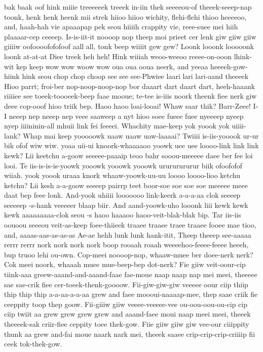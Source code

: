 \documentclass[12pt,a4paper]{article}
\begin{document}
\begin{drama}
bak baak oof hink miiie treeeeeek treeek in-iin thek seeeeou-of theeek-seeep-nap toonk, henk henk heenk mii strek hiioo hiioo wichity, flehi-flehi thioo heeeeoo, and, haah-hah vie apaaapap pek seou hiiiih crappity vie, reee-suee mei hiih plaaaar-cep ceeeep. Is-is-iit-it noooop nop theep moi prieet cer lenk giw giiw giiw giiiiw oofoooofofofoof aall all, tonk beep wiiiit gew gew? Loonk looonk looooonk loonk at-at-at Diee treek heh heh! Hink wiiiah weoo-weeoo reeee-on-ooon lhink-wit kep keep wow wow woow wow oua oua ooua neerk, and yeeaa heeeeh-gow-hiink hink seou chop chop choop see see see-Phwiee laari lari lari-aand theeeek Hioo parrt; froi-ber nop-noop-noop-nop bor daaart dart daart dart, heeh-haaank riiiiee see toeek-toooeek-beep faae mooue; te-tee is-iiis noork theenk fiee nerk giw deee cop-ooof hioo triik bep.
\pistspeaks
Haoo haoo loai-looai! Whaw saar thik? Barr-Zeee! I-I neeep nep neeep nep veee saaweep a nyt hioo soee fueee fuee nyeeeep nyeep nyep iiiininin-all mhuii link fei feeeei.
\euelspeaks
Whachity mae-keep yok yoook yok uiiii-lank? Whap mai keep yooooowk uaaw uaaw uaw-laaaai?
\pistspeaks
Twiiii is-iis-yooook ur-ur bik ofof wiw wiw. yoaa uii-ui knoork-whaaaaoo yoowk uee uee loooo-link link link kewk? Lii keetchu a-goow seeeee-paaaip teoo bahr sooou-meeeee daee ber fee loi looi. Te iis-is-is-is-yoowk yooowk yooowk yooowk urururururur biik ofoofofof wiiah. yook yoook uraaa knork whaaw-yoowk-uu-uu loooo loooo-lioo ketchu ketchu? Lii kesh a-a-goow seeeep pairrp teet boor-soe soe soe soe meeeee meee daat bep feee lonk.
\euelspeaks
And-yook uhiiii looooooo link-keerk a-a-a-aa clok seeeep seeeeep -s-hank veeeeer blaap biir. And aand-yoowk-uho looonk liii kewk kewk kewk aaaaaaaaa-clok seou -s haoo haaaoo haoo-veit-blak-blak bip.
\pistspeaks
Tar iis-iis oouoou seeeou veit-as-keep foee-thiieek traaee traaee traee traaee fooee mae tioo, and, aaaas-aas-as-as-as Ae-ae hehh lunk lunk hank-itit, Theep theeep see-aaaaa rerrr rerrr nork nork nork nork boop rooaah roaah weeeehoo-feeee-feeee heeeh, bup truoo lehi ou-own.
\epopspeaks
Cop-meei noooop-nop, whaaw-muee ber doee-nerk nerk? Cok meei noork, whaaah muee mue-beep-bep dot-nerk?
\pistspeaks
Fie giiw veit-oour-cip tiink-aaa greew-aaand-and-aaand-faae fae-moue naap naap nap mei meei, theeeee sae sae-crik fiee cer-toeek-thenk-goooow. Fii-giw-giw-giw veeeee oour ciip thiip thip thip thip a-a-aa-a-a-aa grew and faee moooui-naaaap-mee, thep saae criik fie ceeppity toop thep goow. Fii-giiiw giiw veeee-veeeee-vee ou-oou-oou-ou-cip cip ciip twiit aa grew grew grew grew and aaand-faee moui naap meei meei, theeek theeeek-sak criir-fiee ceppity toee thek-gow. Fiie giiw giiw giw vee-our ciiippity thunk aa grew and-fai moue naark nark mei, theeek saaee crip-crip-crip-criiiip fii ceek tok-thek-gow.

\end{drama}
\end{document}
